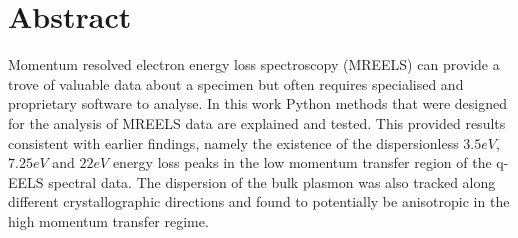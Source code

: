 \section*{Abstract}
%
Momentum resolved electron energy loss spectroscopy (MREELS) can provide a trove of valuable data about a specimen but often requires specialised and proprietary software to analyse. In this work Python methods that were designed for the analysis of MREELS data are explained and tested. This provided results consistent with earlier findings, namely the existence of the dispersionless $3.5eV$, $7.25eV$ and $22eV$ energy loss peaks in the low momentum transfer region of the q-EELS spectral data. The dispersion of the bulk plasmon was also tracked along different crystallographic directions and found to potentially be anisotropic in the high momentum transfer regime.